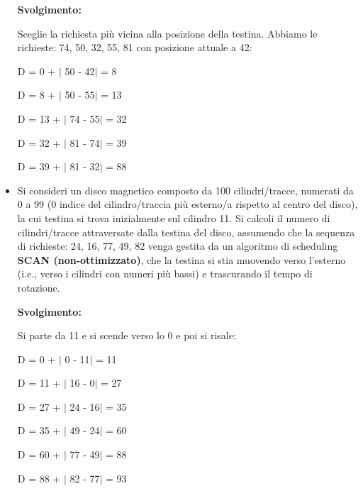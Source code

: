 \documentclass{article}
\begin{document}
\begin{itemize}
    \textbf{Svolgimento:}\par
    Sceglie la richiesta più vicina alla posizione della testina. Abbiamo le richieste: 74, 50, 32, 55, 81 con posizione attuale a 42: 
    \begin{center}
        D = 0 +  $|$ 50 - 42$|$  = 8\par
        D = 8 +  $|$ 50 - 55$|$  = 13\par
        D = 13 + $|$ 74 - 55$|$  = 32\par
        D = 32 + $|$ 81 - 74$|$  = 39\par
        D = 39 + $|$ 81 - 32$|$  = 88\par
    \end{center}
    \item Si consideri un disco magnetico composto da 100 cilindri/tracce, numerati da 0 a 99 (0 indice del cilindro/traccia più esterno/a rispetto al centro del disco), la cui testina si trova inizialmente sul cilindro 11. Si calcoli il numero di cilindri/tracce attraversate dalla testina del disco, assumendo che la sequenza di richieste: 24, 16, 77, 49, 82 venga gestita da un algoritmo di scheduling \textbf{SCAN (non-ottimizzato)}, che la testina si stia muovendo verso l'esterno (i.e., verso i cilindri con numeri più bassi) e trascurando il tempo di rotazione.\par
    \textbf{Svolgimento:}\par
    Si parte da 11 e si scende verso lo 0 e poi si risale:
    \begin{center}
        D = 0 +  $|$ 0 - 11$|$  = 11\par
        D = 11 + $|$ 16 - 0$|$  = 27\par
        D = 27 + $|$ 24 - 16$|$ = 35\par
        D = 35 + $|$ 49 - 24$|$ = 60\par
        D = 60 + $|$ 77 - 49$|$ = 88\par
        D = 88 + $|$ 82 - 77$|$ = 93\par
    \end{center}


\end{itemize}
\end{document}
